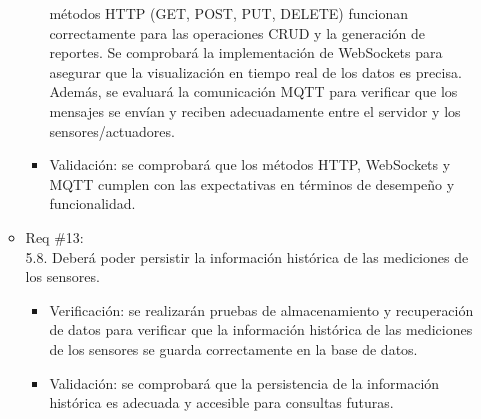 \begin{itemize}
\begin{itemize}
\begin{itemize}
			                  métodos HTTP (GET, POST, PUT, DELETE) funcionan correctamente para las
			                  operaciones CRUD y la generación de reportes. Se comprobará la implementación
			                  de WebSockets para asegurar que la visualización en tiempo real de los datos es
			                  precisa. Además, se evaluará la comunicación MQTT para verificar que los
			                  mensajes se envían y reciben adecuadamente entre el servidor y los
			                  sensores/actuadores.
			            \item Validación: se comprobará que los métodos HTTP, WebSockets y MQTT cumplen con
			                  las expectativas en términos de desempeño y funcionalidad.
		            \end{itemize}
		      \item Req \#13: \\ 5.8. Deberá poder persistir la información histórica de las
		            mediciones de los sensores.
		            \begin{itemize}
			            \item Verificación: se realizarán pruebas de almacenamiento y recuperación de datos
			                  para verificar que la información histórica de las mediciones de los sensores
			                  se guarda correctamente en la base de datos.
			            \item Validación: se comprobará que la persistencia de la información histórica es
			                  adecuada y accesible para consultas futuras.
		            \end{itemize}
	      \end{itemize}
\end{itemize}

\pagebreak

